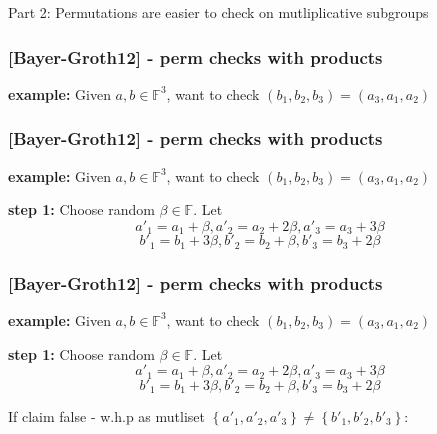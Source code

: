 \documentclass[shadesubsections,trans,14pt,mathserif]{beamer}
\newcommand{\F}{\ensuremath{\mathbb F}}
\newcommand{\set}[1]{\ensuremath{\left\{#1\right\}}}
\begin{document}
\begin{frame}
\large{Part 2: Permutations are easier to check on mutliplicative subgroups
}

\end{frame}

\begin{frame}
\frametitle{{\normalsize{[Bayer-Groth12]}} - perm checks with products}   %
\textbf{example:} Given $a,b\in \F^3$, want to check $(b_1,b_2,b_3) = (a_3,a_1,a_2)$ \\


\end{frame}


\begin{frame}
\frametitle{{\normalsize{[Bayer-Groth12]}} - perm checks with products}   %
\textbf{example:} Given $a,b\in \F^3$, want to check $(b_1,b_2,b_3) = (a_3,a_1,a_2)$ \\
 \vspace{0.2in}

\textbf{step 1:} Choose random $\beta\in \F$. Let
 \[a'_1 = a_1 + \beta, a'_2 = a_2 + 2\beta, a'_3 = a_3 + 3\beta\]
 \[b'_1 = b_1 + 3\beta, b'_2 = b_2 + \beta, b'_3 = b_3 + 2\beta\]

 
 \vspace{0.2in}


\end{frame}
\begin{frame}
\frametitle{{\normalsize{[Bayer-Groth12]}} - perm checks with products}   %
\textbf{example:} Given $a,b\in \F^3$, want to check $(b_1,b_2,b_3) = (a_3,a_1,a_2)$ \\
 \vspace{0.2in}

\textbf{step 1:} Choose random $\beta\in \F$. Let
 \[a'_1 = a_1 + \beta, a'_2 = a_2 + 2\beta, a'_3 = a_3 + 3\beta\]
 \[b'_1 = b_1 + 3\beta, b'_2 = b_2 + \beta, b'_3 = b_3 + 2\beta\]

 
 \vspace{0.2in}

If claim false - w.h.p as mutliset $\set{a'_1,a'_2,a'_3}\neq \set{b'_1,b'_2,b'_3}$:

\end{frame}
\end{document}
